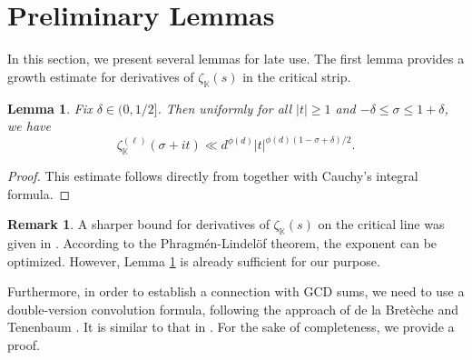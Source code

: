 \documentclass[12pt,reqno]{amsart}
\newtheorem{lem}[thm]{Lemma}
\theoremstyle{definition}
\newtheorem*{xrem}{Remark}
\numberwithin{equation}{section}
\newcommand{\mbk}{\mathbb{K}}
\begin{document}
\section{Preliminary Lemmas}
\label{preliminarylemmas}
In this section, we present several lemmas for late use.
The first lemma provides a growth estimate for derivatives of $\zeta_\mbk(s)$ in the critical strip.
\begin{lem}
    \label{approximatededekind}
    Fix $\delta \in (0, 1/2]$. Then uniformly for all $|t| \ge 1$ and $-\delta \le \sigma \le 1+\delta$, we have
    $$
    \zeta_\mbk^{(\ell)} ( \sigma + it) \ll d^{\phi(d)}|t| ^{\phi(d)(1-\sigma+\delta)/2}.
    $$
\end{lem}
\begin{proof}
    This estimate follows directly from \cite[Theorem 4]{rademacher1959phragmen} together with Cauchy's integral formula.
\end{proof}
\begin{xrem}
    A sharper bound for derivatives of $\zeta_\mbk(s)$ on the critical line was given in \cite{heath1988growth}. According to the Phragm\'en-Lindel\"of theorem, the exponent can be optimized. However, Lemma \ref{approximatededekind} is already sufficient for our purpose.
\end{xrem}
Furthermore, in order to establish a connection with GCD sums, we need to use a double-version convolution formula, following the approach of de la Bretèche and Tenenbaum \cite[Lemma 5.3]{tenen2019galsum}. It is similar to that in \cite[Lemma 3]{yang2022extreme}. For the sake of completeness, we provide a proof.
\end{document}
